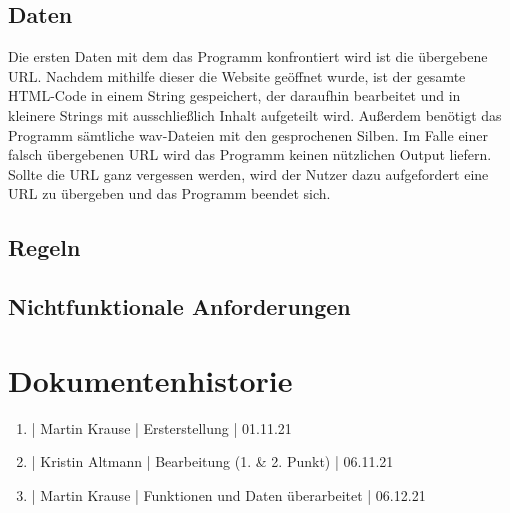 \documentclass[11pt]{scrartcl}
\begin{document}
\subsection{Daten}

Die ersten Daten mit dem das Programm konfrontiert wird ist die übergebene URL. Nachdem mithilfe dieser
die Website geöffnet wurde, ist der gesamte HTML-Code in einem String gespeichert, der daraufhin bearbeitet
und in kleinere Strings mit ausschließlich Inhalt aufgeteilt wird. Außerdem benötigt das Programm sämtliche
wav-Dateien mit den gesprochenen Silben. Im Falle einer falsch übergebenen URL wird das Programm keinen nützlichen Output liefern. Sollte die URL ganz vergessen werden, wird der Nutzer dazu aufgefordert eine URL zu übergeben und das Programm beendet sich.

\subsection{Regeln}


\subsection{Nichtfunktionale Anforderungen}


\section{Dokumentenhistorie}

\begin{enumerate}
	\item | Martin Krause | Ersterstellung | 01.11.21
	\item | Kristin Altmann | Bearbeitung (1. \& 2. Punkt) | 06.11.21
	\item | Martin Krause | Funktionen und Daten überarbeitet | 06.12.21
\end{enumerate}
 
\end{document}
